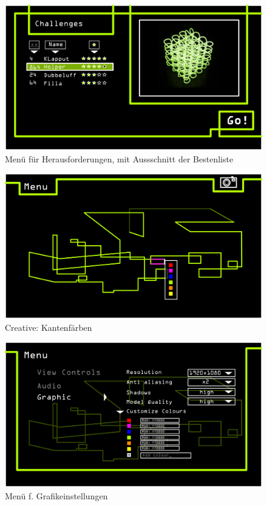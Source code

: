 	\begin{figure}[ht]
	  \centering
	  \includegraphics[width = \textwidth]{Systemmodelle/04_Knot3-select-Challenge.png}
	  \caption{Menü für Herausforderungen, mit Aussschnitt der Bestenliste}
	\end{figure}
	
	\begin{figure}[ht]
	  \centering
	  \includegraphics[width = \textwidth]{Systemmodelle/05_Knot3-Colour-select.png}
	  \caption{Creative: Kantenfärben}
	\end{figure}
	
	\begin{figure}[ht]
	  \centering
	  \includegraphics[width = \textwidth]{Systemmodelle/08_Knot3-menu-graphics.png}
	  \caption{Menü f. Grafikeinstellungen}
	\end{figure}


